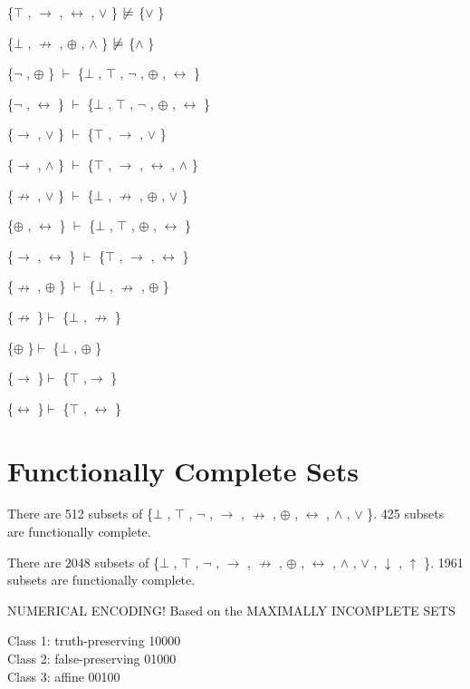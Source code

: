\{$\top$ , $\to$ , $\leftrightarrow$ , $\lor$ \} $\nmodels$  \{$\lor$ \}

\{$\bot$ , $\nrightarrow$ , $\oplus$ , $\land$ \} $\nmodels$  \{$\land$ \}

\{$\neg$ , $\oplus$ \} $\vdash$  \{$\bot$ , $\top$ , $\neg$ , $\oplus$ , $\leftrightarrow$ \}

\{$\neg$ , $\leftrightarrow$ \} $\vdash$  \{$\bot$ , $\top$ , $\neg$ , $\oplus$ , $\leftrightarrow$ \}

\{$\to$ , $\lor$ \} $\vdash$  \{$\top$ , $\to$ , $\lor$ \}

\{$\to$ , $\land$ \} $\vdash$  \{$\top$ , $\to$ , $\leftrightarrow$ , $\land$ \}

\{$\nrightarrow$ , $\lor$ \} $\vdash$  \{$\bot$ , $\nrightarrow$ , $\oplus$ , $\lor$ \}

\{$\oplus$ , $\leftrightarrow$ \} $\vdash$  \{$\bot$ , $\top$ , $\oplus$ , $\leftrightarrow$ \}

\{$\to$ , $\leftrightarrow$ \} $\vdash$  \{$\top$ , $\to$ , $\leftrightarrow$ \}

\{$\nrightarrow$ , $\oplus$ \} $\vdash$  \{$\bot$ , $\nrightarrow$ , $\oplus$ \}

\{$\nrightarrow$ \}$\vdash$ \{$\bot$ , $\nrightarrow$ \}

\{$\oplus$ \}$\vdash$ \{$\bot$ , $\oplus$ \}

\{$\to$ \}$\vdash$ \{$\top$ ,$\to$ \}

\{$\leftrightarrow$ \}$\vdash$ \{$\top$ , $\leftrightarrow$ \}

\hypertarget{functionally-complete-sets}{%
\section{Functionally Complete Sets}\label{functionally-complete-sets}}

There are 512 subsets of \{$\bot$ , $\top$ , $\neg$ , $\to$ , $\nrightarrow$ , $\oplus$ , $\leftrightarrow$ , $\land$ , $\lor$ \}. 425 subsets are
functionally complete.

There are 2048 subsets of \{$\bot$ , $\top$ , $\neg$ , $\to$ , $\nrightarrow$ , $\oplus$ , $\leftrightarrow$ , $\land$ , $\lor$ , $\downarrow$ , $\uparrow$ \}. 1961
subsets are functionally complete.

NUMERICAL ENCODING! Based on the MAXIMALLY INCOMPLETE SETS

Class 1: truth-preserving 10000\\
Class 2: false-preserving 01000\\
Class 3: affine 00100

